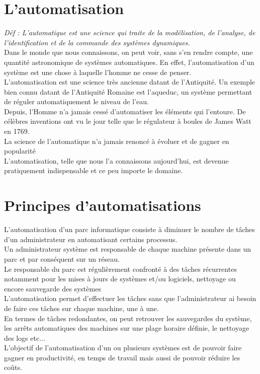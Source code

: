 \documentclass[12pt]{article}
\begin{document}
\section{L'automatisation}

\textit{Déf : L’automatique est une science qui traite de la modélisation, de l’analyse, de l’identification et de la commande des systèmes dynamiques.}
\vspace{0.5cm}
\\
Dans le monde que nous connaissons, on peut voir, sans s'en rendre compte, une quantité astronomique de systèmes automatiques. En effet, l'automatisation d'un système est une chose à laquelle l'homme ne cesse de penser. 
\\
L'automatisation est une science très ancienne datant de l'Antiquité. Un exemple bien connu datant de l'Antiquité Romaine est l'aqueduc, un système permettant de réguler automatiquement le niveau de l'eau.
\\
Depuis, l'Homme n'a jamais cessé d'automatiser les éléments qui l'entoure. De célèbres inventions ont vu le jour telle que le régulateur à boules de James Watt en 1769.
\\
La science de l'automatique n'a jamais renoncé à évoluer et de gagner en popularité
\\
L'automatisation, telle que nous l'a connaissons aujourd'hui, est devenue pratiquement indispensable et ce peu importe le domaine.

\section{Principes d'automatisations}

L'automatisation d'un parc informatique consiste à diminuer le nombre de tâches d'un administrateur en automatisant certains processus.
\\
Un administrateur système est responsable de chaque machine présente dans un parc et par conséquent sur un réseau.
\\
Le responsable du parc est régulièrement confronté à des tâches récurrentes notamment pour les mises à jours de systèmes et/ou logiciels, nettoyage ou encore sauvegarde des systèmes
\\
L'automatisation permet d'effectuer les tâches sans que l'administrateur ai besoin de faire ces tâches sur chaque machine, une à une.
\\
En termes de tâches redondantes, on peut retrouver les sauvegardes du système, les arrêts automatiques des machines sur une plage horaire définie, le nettoyage des logs etc...
\\
L'objectif de l'automatisation d'un ou plusieurs systèmes est de pouvoir faire gagner en productivité, en temps de travail mais aussi de pouvoir réduire les coûts.
\end{document}
